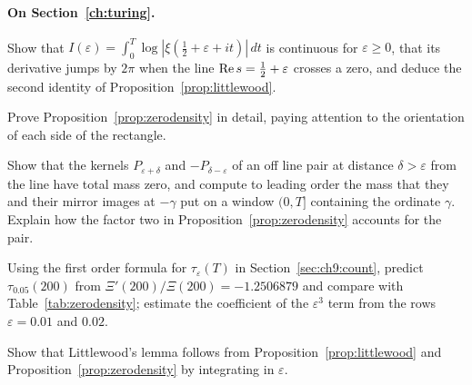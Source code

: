 \paragraph{On Section~\ref{ch:turing}.}
\begin{exercises}
\item Show that $I(\varepsilon)=\int_0^T\log|\xi(\frac12+\varepsilon+it)|\,dt$ is continuous for $\varepsilon\ge0$, that its derivative jumps by $2\pi$ when the line $\operatorname{Re} s=\frac12+\varepsilon$ crosses a zero, and deduce the second identity of Proposition~\ref{prop:littlewood}.
\item Prove Proposition~\ref{prop:zerodensity} in detail, paying attention to the orientation of each side of the rectangle.
\item\label{ex:ch9:pair} Show that the kernels $P_{\varepsilon+\delta}$ and $-P_{\delta-\varepsilon}$ of an off line pair at distance $\delta>\varepsilon$ from the line have total mass zero, and compute to leading order the mass that they and their mirror images at $-\gamma$ put on a window $(0,T]$ containing the ordinate $\gamma$. Explain how the factor two in Proposition~\ref{prop:zerodensity} accounts for the pair.
\item Using the first order formula for $\tau_\varepsilon(T)$ in Section~\ref{sec:ch9:count}, predict $\tau_{0.05}(200)$ from $\Xi'(200)/\Xi(200)=-1.2506879$ and compare with Table~\ref{tab:zerodensity}; estimate the coefficient of the $\varepsilon^3$ term from the rows $\varepsilon=0.01$ and $0.02$.
\item\label{ex:ch9:littlewood} Show that Littlewood's lemma follows from Proposition~\ref{prop:littlewood} and Proposition~\ref{prop:zerodensity} by integrating in $\varepsilon$.
\end{exercises}
